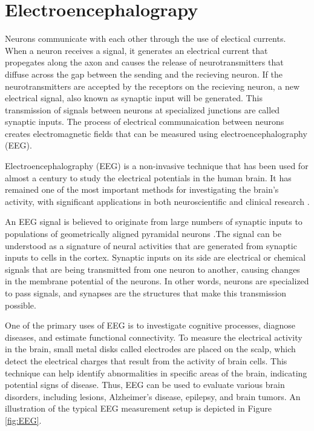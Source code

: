 \documentclass[a4paper, UKenglish, 11pt]{uiomaster}
\begin{document}

\chapter{Electroencephalograpy}
Neurons communicate with each other through the use of electical currents. When a neuron receives a signal, it generates an electrical current that propegates along the axon and causes the release of neurotransmitters that diffuse across the gap between the sending and the recieving neuron. If the neurotransmitters are accepted by the receptors on the recieving neuron, a new electrical signal, also known as synaptic input will be generated. This transmission of signals between neurons at specialized junctions are called synaptic inputs. The process of electrical communaication between neurons creates electromagnetic fields that can be measured using electroencephalography (EEG).

Electroencephalography (EEG) is a non-invasive technique that has been used for almost a century to study the electrical potentials in the human brain. It has remained one of the most important methods for investigating the brain's activity, with significant applications in both neuroscientific and clinical research \cite{ilmoniemi2019brain}.

An EEG signal is believed to originate from large numbers of synaptic inputs to populations of geometrically aligned pyramidal neurons \cite{nunez2006electric}.The signal can be understood as a signature of neural activities that are generated from synaptic inputs to cells in the cortex. Synaptic inputs on its side are electrical or chemical signals that are being transmitted from one neuron to another, causing changes in the membrane potential of the neurons. In other words, neurons are specialized to pass signals, and synapses are the structures that make this transmission possible.

One of the primary uses of EEG is to investigate cognitive processes, diagnose diseases, and estimate functional connectivity. To measure the electrical activity in the brain, small metal disks called electrodes are placed on the scalp, which detect the electrical charges that result from the activity of brain cells. This technique can help identify abnormalities in specific areas of the brain, indicating potential signs of disease. Thus, EEG can be used to evaluate various brain disorders, including lesions, Alzheimer's disease, epilepsy, and brain tumors. An illustration of the typical EEG measurement setup is depicted in Figure \ref{fig:EEG}.
\end{document}
